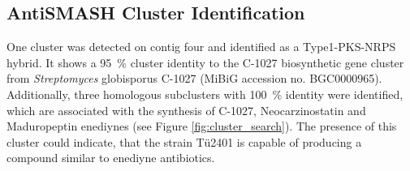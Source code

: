 
    \subsection{AntiSMASH Cluster Identification} %
    \label{sub:antismash_cluster_identification}

	 One cluster was detected on contig four and identified as a Type1-PKS-NRPS hybrid.
	 It shows a 95~\% cluster identity to the C-1027 biosynthetic gene cluster from \textit{Streptomyces} globisporus C-1027 (MiBiG accession no. BGC0000965). Additionally, three homologous subclusters with 100~\% identity were identified, which are associated with the synthesis of C-1027, Neocarzinostatin and Maduropeptin enediynes (see Figure \ref{fig:cluster_search}).
	 The presence of this cluster could indicate, that the strain Tü2401 is capable of producing a compound similar to enediyne antibiotics. 
	 
